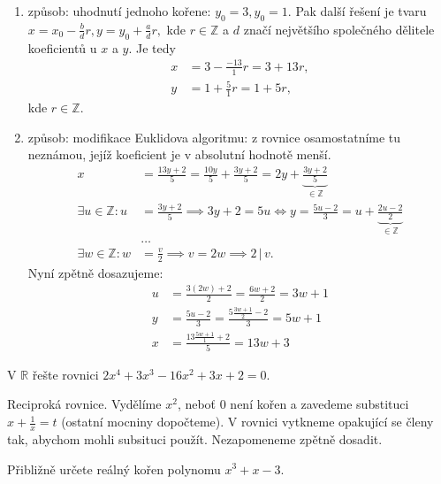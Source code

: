\begin{reseni}
\begin{enumerate}[1.]
\item způsob: uhodnutí jednoho kořene: $y_0=3, y_0=1.$ Pak další řešení je tvaru
$x=x_0-\frac{b}{d}r, y=y_0+\frac{a}{d}r,$ kde $r \in \mathbb Z$ a $d$ značí
největšího společného dělitele koeficientů u $x$ a $y$. Je tedy
\begin{align*}
    x&=3-\frac{-13}{1}r=3+13r, \\
    y &= 1+\frac{5}{1}r = 1+5r,
\end{align*}
kde $r\in \mathbb Z.$
\item způsob: modifikace Euklidova algoritmu: z rovnice osamostatníme tu neznámou,
jejíž koeficient je v absolutní hodnotě menší.
\begin{align*}
    x &= \frac{13y+2}{5}=\frac{10y}{5}+\frac{3y+2}{5}=2y+\underbrace{\frac{3y+2}{5}}_{\in \mathbb Z}\\
    \exists u \in \mathbb Z: u &= \frac{3y+2}{5}\implies 3y+2=5u \iff y=\frac{5u-2}{3}=u+\underbrace{\frac{2u-2}{2}}_{\in \mathbb Z} \\
     & \dots \\
     \exists w \in \mathbb Z: w &= \frac{v}{2}\implies v = 2w \implies 2 \, | \, v.
\end{align*}
Nyní zpětně dosazujeme:
\begin{align*}
    u&= \frac{3(2w)+2}{2}=\frac{6w+2}{2}=3w+1\\
    y&=\frac{5u-2}{3}=\frac{5 \frac{3w+1}{2}-2}{3}=5w+1 \\
    x &= \frac{13 \frac{5w+1}{1}+2}{5}=13w+3
\end{align*}
\end{enumerate}
\end{reseni}

\begin{priklad}
V $\mathbb R$ řešte rovnici $2x^4+3x^3-16x^2+3x+2=0.$
\end{priklad}

\begin{reseni}
Reciproká rovnice. Vydělíme $x^2$, neboť 0 není kořen a zavedeme substituci
$x+\frac{1}{x}=t$ (ostatní mocniny dopočteme). V rovnici vytkneme opakující se členy
tak, abychom mohli  subsituci použít. Nezapomeneme zpětně dosadit.
\end{reseni}

\begin{priklad}
Přibližně určete reálný kořen polynomu $x^3+x-3$.
\end{priklad}

